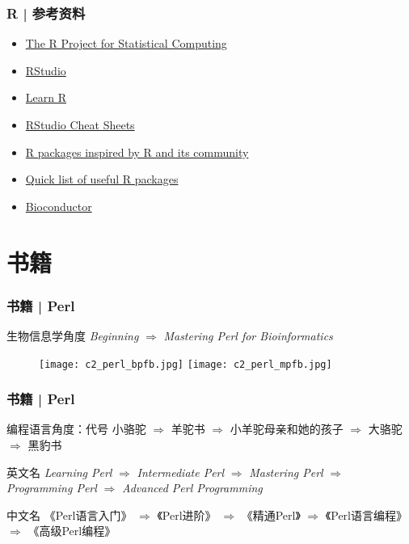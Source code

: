 \begin{frame}
  \frametitle{R | 参考资料}
   \begin{itemize}
     \item \href{https://www.r-project.org/}{The R Project for Statistical Computing}
     \item \href{https://www.rstudio.com/}{RStudio}
     \item \href{https://support.rstudio.com/hc/en-us/categories/200098757-Learn-R}{Learn R}
     \item \href{https://www.rstudio.com/resources/cheatsheets/}{RStudio Cheat Sheets}
     \item \href{https://www.rstudio.com/products/rpackages/}{R packages inspired by R and its community}
     \item \href{https://support.rstudio.com/hc/en-us/articles/201057987-Quick-list-of-useful-R-packages}{Quick list of useful R packages}
     \item \href{https://www.bioconductor.org/}{Bioconductor}
   \end{itemize}
\end{frame}

\section{书籍}
\begin{frame}
  \frametitle{书籍 | Perl}
  \begin{block}{生物信息学角度}
    \textit{Beginning} $\Longrightarrow$ \textit{Mastering Perl for Bioinformatics}
  \end{block}
  \begin{figure}
    \centering
    \texttt{[image: c2\_perl\_bpfb.jpg]}
    \hspace{1em}
    \texttt{[image: c2\_perl\_mpfb.jpg]}
  \end{figure}
\end{frame}

\begin{frame}
  \frametitle{书籍 | Perl}
  \begin{block}{编程语言角度：代号}
小骆驼 $\Rightarrow$ 羊驼书 $\Rightarrow$ 小羊驼母亲和她的孩子 $\Rightarrow$ 大骆驼 $\Rightarrow$ 黑豹书
  \end{block}
  \pause
  \begin{block}{英文名}
    \textit{Learning Perl} $\Rightarrow$ \textit{Intermediate Perl} $\Rightarrow$ \textit{Mastering Perl} $\Rightarrow$ \textit{Programming Perl} $\Rightarrow$ \textit{Advanced Perl Programming}
  \end{block}
  \pause
  \begin{block}{中文名}
    《Perl语言入门》 $\Rightarrow$ 《Perl进阶》 $\Rightarrow$ 《精通Perl》 $\Rightarrow$ 《Perl语言编程》 $\Rightarrow$ 《高级Perl编程》
  \end{block}
  \pause
\end{frame}


